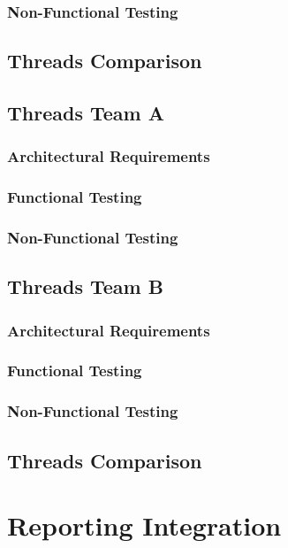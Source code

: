 \documentclass[12pt, oneside]{article}
\begin{document}
		\subsubsection{Non-Functional Testing }
	
	\subsection{Threads Comparison}
		\subsection{Threads Team A}	
		\subsubsection{Architectural Requirements}
		\subsubsection{Functional Testing}
		\subsubsection{Non-Functional Testing }
	
	\subsection{Threads Team B}	
		\subsubsection{Architectural Requirements}
		\subsubsection{Functional Testing}
		\subsubsection{Non-Functional Testing }
	
	\subsection{Threads Comparison}

\section{Reporting Integration}
\end{document}
